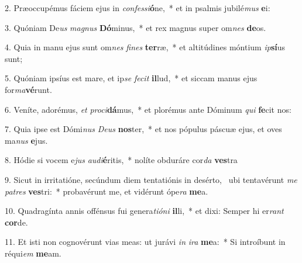 2. Præoccupémus fáciem ejus in \textit{con}\textit{fes}\textit{si}\textbf{ó}ne,~*  et in psalmis jubilé\textit{mus} \textbf{e}i:\

3. Quóniam De\textit{us} \textit{ma}\textit{gnus} \textbf{Dó}minus,~*  et rex magnus super om\textit{nes} \textbf{de}os.\

4. Quia in manu ejus sunt om\textit{nes} \textit{fi}\textit{nes} \textbf{ter}ræ,~*  et altitúdines móntium \textit{ip}\textbf{sí}us sunt;\

5. Quóniam ipsíus est mare, et ip\textit{se} \textit{fe}\textit{cit} \textbf{il}lud,~*  et siccam manus ejus for\textit{ma}\textbf{vé}runt.\

6. Veníte, adorémus, \textit{et} \textit{pro}\textit{ci}\textbf{dá}mus,~*  et plorémus ante Dóminum \textit{qui} \textbf{fe}cit nos:\

7. Quia ipse est Dómi\textit{nus} \textit{De}\textit{us} \textbf{nos}ter,~*  et nos pópulus páscuæ ejus, et oves ma\textit{nus} \textbf{e}jus.\

8. Hódie si vocem e\textit{jus} \textit{au}\textit{di}\textbf{é}ritis,~*  nolíte obduráre cor\textit{da} \textbf{ves}tra\

9. Sicut in irritatióne, secúndum diem tentatiónis in desérto, \dag\  ubi tentavérunt \textit{me} \textit{pa}\textit{tres} \textbf{ves}tri:~*  probavérunt me, et vidérunt ópe\textit{ra} \textbf{me}a.\

10. Quadragínta annis offénsus fui genera\textit{ti}\textit{ó}\textit{ni} \textbf{il}li,~*  et dixi: Semper hi er\textit{rant} \textbf{cor}de.\

11. Et isti non cognovérunt vias meas: ut jurávi \textit{in} \textit{i}\textit{ra} \textbf{me}a:~*  Si introíbunt in réqui\textit{em} \textbf{me}am.\

